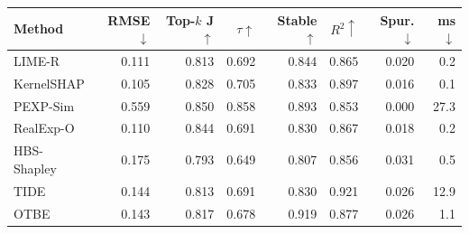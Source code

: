 \begin{tabular}{lrrrrrrr}
\toprule
Method & RMSE$\downarrow$ & Top-$k$ J$\uparrow$ & $\tau\uparrow$ & Stable$\uparrow$ & $R^2\uparrow$ & Spur.$\downarrow$ & ms$\downarrow$\\
\midrule
LIME-R & 0.111 & 0.813 & 0.692 & 0.844 & 0.865 & 0.020 & 0.2\\
KernelSHAP & 0.105 & 0.828 & 0.705 & 0.833 & 0.897 & 0.016 & 0.1\\
PEXP-Sim & 0.559 & 0.850 & 0.858 & 0.893 & 0.853 & 0.000 & 27.3\\
RealExp-O & 0.110 & 0.844 & 0.691 & 0.830 & 0.867 & 0.018 & 0.2\\
HBS-Shapley & 0.175 & 0.793 & 0.649 & 0.807 & 0.856 & 0.031 & 0.5\\
TIDE & 0.144 & 0.813 & 0.691 & 0.830 & 0.921 & 0.026 & 12.9\\
OTBE & 0.143 & 0.817 & 0.678 & 0.919 & 0.877 & 0.026 & 1.1\\
\bottomrule
\end{tabular}